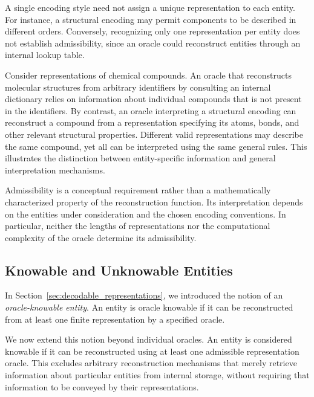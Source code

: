 A single encoding style need not assign a unique representation to each entity. For instance, a structural encoding may permit components to be described in different orders. Conversely, recognizing only one representation per entity does not establish admissibility, since an oracle could reconstruct entities through an internal lookup table.

\begin{example}
Consider representations of chemical compounds. An oracle that reconstructs molecular structures from arbitrary identifiers by consulting an internal dictionary relies on information about individual compounds that is not present in the identifiers. By contrast, an oracle interpreting a structural encoding can reconstruct a compound from a representation specifying its atoms, bonds, and other relevant structural properties. Different valid representations may describe the same compound, yet all can be interpreted using the same general rules. This illustrates the distinction between entity-specific information and general interpretation mechanisms.
\end{example}

Admissibility is a conceptual requirement rather than a mathematically characterized property of the reconstruction function. Its interpretation depends on the entities under consideration and the chosen encoding conventions. In particular, neither the lengths of representations nor the computational complexity of the oracle determine its admissibility.


\subsection*{Knowable and Unknowable Entities}
\label{sec:unknowable_entities}

In Section~\ref{sec:decodable_representations}, we introduced the notion of an \emph{oracle-knowable entity}. An entity is oracle knowable if it can be reconstructed from at least one finite representation by a specified oracle.

We now extend this notion beyond individual oracles. An entity is considered knowable if it can be reconstructed using at least one admissible representation oracle. This excludes arbitrary reconstruction mechanisms that merely retrieve information about particular entities from internal storage, without requiring that information to be conveyed by their representations.

